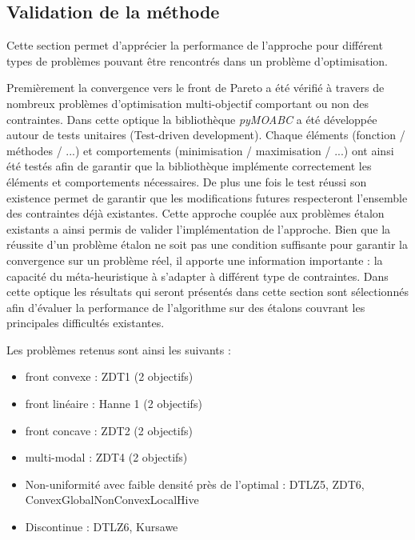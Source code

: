 \subsection{Validation de la méthode} %
\label{sub:validation_de_la_methode}
Cette section permet d’apprécier la performance de l’approche pour différent types
de problèmes pouvant être rencontrés dans un problème d’optimisation.


Premièrement la convergence vers le front de Pareto a été vérifié à travers de nombreux
problèmes d’optimisation multi-objectif comportant ou non des contraintes.
Dans cette optique la bibliothèque \emph{pyMOABC} a été développée autour de tests unitaires
(Test-driven development).
Chaque éléments (fonction / méthodes / ...) et comportements (minimisation / maximisation / ...)
ont ainsi été testés afin de garantir que la bibliothèque implémente correctement
les éléments et comportements nécessaires. De plus une fois le test réussi son existence
permet de garantir que les modifications futures respecteront l’ensemble des contraintes
déjà existantes.
Cette approche couplée aux problèmes étalon existants a ainsi permis de valider
l’implémentation de l’approche. Bien que la réussite d’un problème étalon ne soit
pas une condition suffisante pour garantir la convergence sur un problème réel,
il apporte une information importante : la capacité du méta-heuristique à s’adapter
à différent type de contraintes. Dans cette optique les résultats
qui seront présentés dans cette section sont sélectionnés afin d’évaluer la performance
de l’algorithme sur des étalons couvrant les principales difficultés existantes.

Les problèmes retenus sont ainsi les suivants :
\begin{itemize}
  \item front convexe : ZDT1 (2 objectifs)
  \item front linéaire : Hanne 1 (2 objectifs)
  \item front concave : ZDT2 (2 objectifs)
  \item multi-modal : ZDT4 (2 objectifs)
  \item Non-uniformité avec faible densité près de l’optimal : DTLZ5, ZDT6, ConvexGlobalNonConvexLocalHive
  \item Discontinue : DTLZ6, Kursawe
\end{itemize}

